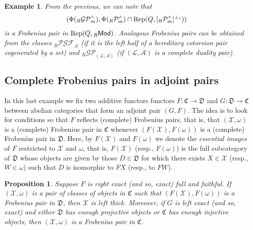 \documentclass[10pt,reqno]{amsart}
\numberwithin{equation}{section}
\newtheorem{example}[definition]{Example}
\newtheorem{proposition}[definition]{Proposition}
\theoremstyle{remark}
\newcommand{\A}{\mathcal{A}}
\newcommand{\C}{\mathfrak{C}}
\newcommand{\X}{\mathcal{X}}
\begin{document}
\begin{example}
From the previous, we can note that $$(\Phi({}_R\mathcal{GP}^\wedge_m), \Phi({}_R\mathcal{P}^\wedge_m) \cap {\rm Rep}(Q,[{}_R\mathcal{P}^\wedge_m]^{\perp_1}))$$ is a Frobenius pair in ${\rm Rep}(Q,{}_R\mathsf{Mod})$. Analogous Frobenius pairs can be obtained from the classes ${}_R\mathcal{PGF}_{\A}$ (if it is the left half of a hereditary cotorsion pair cogenerated by a set) and ${}_R\mathcal{GP}_{(\mathcal{L,A})}$ (if $(\mathcal{L,A})$ is a complete duality pair).
\end{example}
 
 

\subsection*{Complete Frobenius pairs in adjoint pairs}

In this last example we fix two additive functors functors $F \colon \C \to \mathfrak{D}$ and $G \colon \mathfrak{D} \to \C$ between abelian categories that form an adjoint pair $(G, F)$. The idea is to look for conditions so that $F$ reflects (complete) Frobenius pairs, that is, that $(\X,\omega)$ is a (complete) Frobenius pair in $\C$ whenever $(F(\X),F(\omega))$ is a (complete) Frobenius pair in $\mathfrak{D}$. Here, by $F(\X)$ and $F(\omega)$ we denote the \emph{essential images} of $F$ restricted to $\X$ and $\omega$, that is, $F(\X)$ (resp., $F(\omega)$) is the full subcategory of $\mathfrak{D}$ whose objects are given by those $D \in \mathfrak{D}$ for which there exists $X \in \X$ (resp., $W \in \omega$) such that $D$ is isomorphic to $FX$ (resp., to $FW$). 


\begin{proposition} \label{Funtor-Frob}
Suppose $F$ is right exact (and so, exact) full and faithful. If $(\X, \omega)$ is a pair of classes of objects in $\C$ such that $(F(\X), F (\omega))$ is a Frobenius pair in $\mathfrak{D}$, then $\X$ is left thick. Moreover, if $G$ is left exact (and so, exact) and either $\mathfrak{D}$ has enough projective objects or $\C$ has enough injective objects,  then $(\X, \omega)$ is a Frobenius pair in $\C$. \\
\end{proposition}
\end{document}
